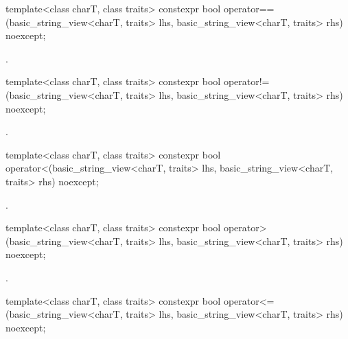 %
\begin{itemdecl}
template<class charT, class traits>
  constexpr bool operator==(basic_string_view<charT, traits> lhs,
                            basic_string_view<charT, traits> rhs) noexcept;
\end{itemdecl}

\begin{itemdescr}
\pnum
\returns
{}.
\end{itemdescr}

%
\begin{itemdecl}
template<class charT, class traits>
  constexpr bool operator!=(basic_string_view<charT, traits> lhs,
                            basic_string_view<charT, traits> rhs) noexcept;
\end{itemdecl}

\begin{itemdescr}
\pnum
\returns
{}.
\end{itemdescr}

%
\begin{itemdecl}
template<class charT, class traits>
  constexpr bool operator<(basic_string_view<charT, traits> lhs,
                           basic_string_view<charT, traits> rhs) noexcept;
\end{itemdecl}

\begin{itemdescr}
\pnum
\returns
{}.
\end{itemdescr}

%
\begin{itemdecl}
template<class charT, class traits>
  constexpr bool operator>(basic_string_view<charT, traits> lhs,
                           basic_string_view<charT, traits> rhs) noexcept;
\end{itemdecl}

\begin{itemdescr}
\pnum
\returns
{}.
\end{itemdescr}

%
\begin{itemdecl}
template<class charT, class traits>
  constexpr bool operator<=(basic_string_view<charT, traits> lhs,
                            basic_string_view<charT, traits> rhs) noexcept;
\end{itemdecl}

